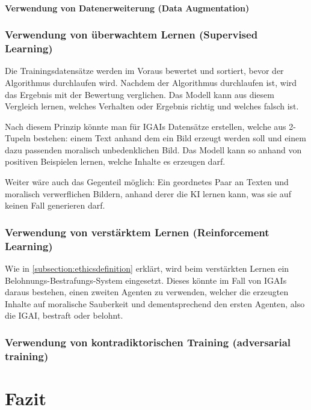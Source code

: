 \documentclass[12pt]{article}
\begin{document}
\subsubsection{Verwendung von Datenerweiterung (Data Augmentation)}

\subsection{Verwendung von überwachtem Lernen (Supervised Learning)}
Die Trainingsdatensätze werden im Voraus bewertet und sortiert, bevor der Algorithmus durchlaufen wird. Nachdem der Algorithmus durchlaufen ist, wird das Ergebnis mit der Bewertung verglichen. 
Das Modell kann aus diesem Vergleich lernen, welches Verhalten oder Ergebnis richtig und welches falsch ist.

Nach diesem Prinzip könnte man für IGAIs Datensätze erstellen, welche aus 2-Tupeln bestehen: einem Text anhand dem ein Bild erzeugt werden soll und einem dazu passenden moralisch unbedenklichen Bild. 
Das Modell kann so anhand von positiven Beispielen lernen, welche Inhalte es erzeugen darf.

Weiter wäre auch das Gegenteil möglich: Ein geordnetes Paar an Texten und moralisch verwerflichen Bildern, anhand derer die KI lernen kann, was sie auf keinen Fall generieren darf.

\subsection{Verwendung von verstärktem Lernen (Reinforcement Learning)}
Wie in \ref{subsection:ethicsdefinition} erklärt, wird beim verstärkten Lernen ein Belohnungs-Bestrafungs-System eingesetzt. Dieses könnte im Fall von IGAIs daraus bestehen, einen zweiten Agenten zu verwenden, welcher die erzeugten Inhalte auf moralische Sauberkeit und dementsprechend den ersten Agenten, also die IGAI, bestraft oder belohnt.

\subsection{Verwendung von kontradiktorischen Training (adversarial training)}



\chapter{Fazit}


\end{document}
